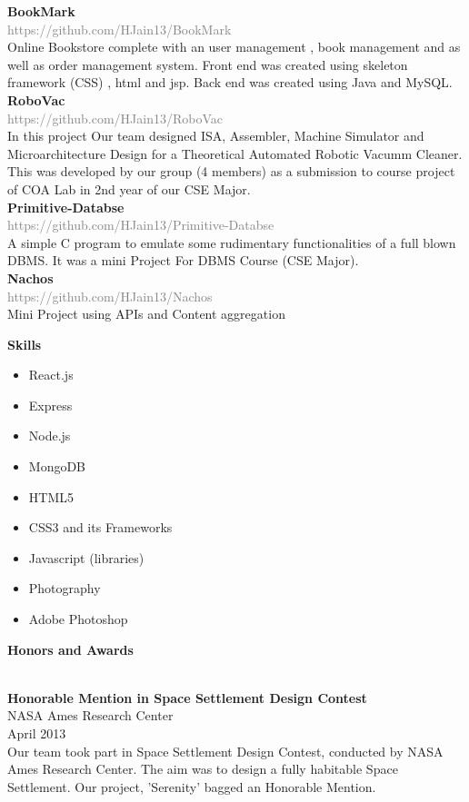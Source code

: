 \documentclass[12pt]{article}
\newcommand{\mybox}[1]{\par\noindent\colorbox{shadecolor}
{\parbox{\dimexpr\textwidth-2\fboxsep\relax}{#1}}}
\begin{document}
\textbf{BookMark}\\
\textcolor{gray}{https://github.com/HJain13/BookMark}\\
Online Bookstore complete with an user management , book management and as well as order management system. Front end was created using skeleton framework (CSS) , html and jsp. Back end was created using Java and MySQL.\\
\textbf{RoboVac}\\
\textcolor{gray}{https://github.com/HJain13/RoboVac}\\
In this project Our team designed ISA, Assembler, Machine Simulator and Microarchitecture Design for a Theoretical Automated Robotic Vacumm Cleaner. This was developed by our group (4 members) as a submission to course project of COA Lab in 2nd year of our CSE Major.\\
\textbf{Primitive-Databse}\\
\textcolor{gray}{https://github.com/HJain13/Primitive-Databse}\\
A simple C program to emulate some rudimentary functionalities of a full blown DBMS. It was a mini Project For DBMS Course (CSE Major).\\
\textbf{Nachos}\\
\textcolor{gray}{https://github.com/HJain13/Nachos}\\
Mini Project using APIs and Content aggregation\\
\hrulefill
\begin{large}
\mybox{\textbf{Skills}}
\end{large}
\begin{itemize}
  \item React.js
  \item Express
  \item Node.js
  \item MongoDB
  \item HTML5
  \item CSS3 and its Frameworks
  \item Javascript (libraries)
  \item Photography
  \item Adobe Photoshop

\end{itemize}
\begin{large}
\mybox{\textbf{Honors and Awards}}
\end{large}
\\
\textbf{Honorable Mention in Space Settlement Design Contest}\\
NASA Ames Research Center\\
April 2013\\
Our team took part in Space Settlement Design Contest, conducted by NASA Ames Research Center. The aim was to design a fully habitable Space Settlement. Our project, 'Serenity'  bagged an Honorable Mention.\\
\hrulefill
\end{document}
